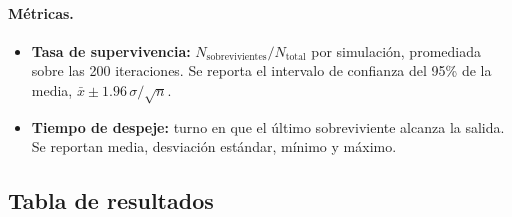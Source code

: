 \documentclass[11pt,a4paper]{article}
\begin{document}
\paragraph{Métricas.}
\begin{itemize}
  \item \textbf{Tasa de supervivencia:} $N_{\text{sobrevivientes}} / N_{\text{total}}$ por simulación, promediada sobre las 200 iteraciones. Se reporta el intervalo de confianza del 95\% de la media, $\bar{x} \pm 1.96\,\sigma/\sqrt{n}$.
  \item \textbf{Tiempo de despeje:} turno en que el último sobreviviente alcanza la salida. Se reportan media, desviación estándar, mínimo y máximo.
\end{itemize}

\subsection{Tabla de resultados}
\end{document}
